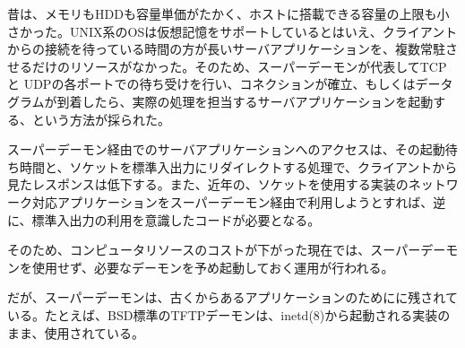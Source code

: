 昔は、メモリもHDDも容量単価がたかく、ホストに搭載できる容量の上限も小さかった。UNIX系のOSは仮想記憶をサポートしているとはいえ、クライアントからの接続を待っている時間の方が長いサーバアプリケーションを、複数常駐させるだけのリソースがなかった。そのため、スーパーデーモンが代表してTCPと UDPの各ポートでの待ち受けを行い、コネクションが確立、もしくはデータグラムが到着したら、実際の処理を担当するサーバアプリケーションを起動する、という方法が採られた。

スーパーデーモン経由でのサーバアプリケーションへのアクセスは、その起動待ち時間と、ソケットを標準入出力にリダイレクトする処理で、クライアントから見たレスポンスは低下する。また、近年の、ソケットを使用する実装のネットワーク対応アプリケーションをスーパーデーモン経由で利用しようとすれば、逆に、標準入出力の利用を意識したコードが必要となる。

そのため、コンピュータリソースのコストが下がった現在では、スーパーデーモンを使用せず、必要なデーモンを予め起動しておく運用が行われる。

だが、スーパーデーモンは、古くからあるアプリケーションのためにに残されている。たとえば、BSD標準のTFTPデーモンは、inetd(8)から起動される実装のまま、使用されている。

